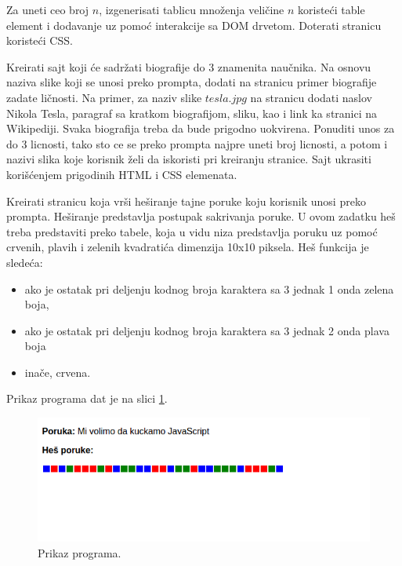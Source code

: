 \begin{primer}
Za uneti ceo broj $n$, izgenerisati tablicu množenja veličine $n$ koristeći table element i dodavanje uz pomoć interakcije sa DOM drvetom. Doterati stranicu koristeći CSS.
\end{primer}

\begin{primer}
Kreirati sajt koji će sadržati biografije do 3 znamenita naučnika. Na osnovu naziva slike koji se unosi preko prompta, dodati na stranicu primer biografije zadate ličnosti. Na primer, za naziv slike $tesla.jpg$ na stranicu dodati naslov Nikola Tesla, paragraf sa kratkom biografijom, sliku, kao i link ka stranici na Wikipediji. Svaka biografija treba da bude prigodno uokvirena. Ponuditi unos za do 3 licnosti, tako sto ce se preko prompta najpre uneti broj licnosti, a potom i nazivi slika koje korisnik želi da iskoristi pri kreiranju stranice. Sajt ukrasiti korišćenjem prigodinih HTML i CSS elemenata.
\end{primer}

\begin{primer}
Kreirati stranicu koja vrši heširanje tajne poruke koju korisnik unosi preko prompta. Heširanje predstavlja postupak sakrivanja poruke. U ovom zadatku heš treba predstaviti preko tabele, koja u vidu niza predstavlja poruku uz pomoć crvenih, plavih i zelenih kvadratića dimenzija 10x10 piksela. Heš funkcija je sledeća:
\begin{itemize}
\item ako je ostatak pri deljenju kodnog broja karaktera sa 3 jednak 1 onda zelena boja,
\item ako je ostatak pri deljenju kodnog broja karaktera sa 3 jednak 2 onda plava boja
\item inače, crvena. 
\end{itemize}
Prikaz programa dat je na slici \ref{fig:hes}.
\begin{figure}[h!]
\begin{center}
\includegraphics[scale=0.5]{./pictures/hes.png}
\end{center}
\caption{Prikaz programa.}
\label{fig:hes}
\end{figure}

\end{primer}


